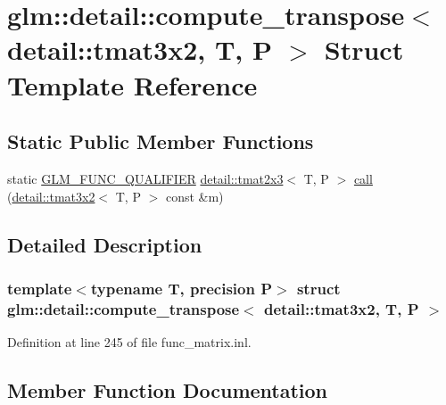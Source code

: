 \hypertarget{structglm_1_1detail_1_1compute__transpose_3_01detail_1_1tmat3x2_00_01_t_00_01_p_01_4}{}\section{glm\+:\+:detail\+:\+:compute\+\_\+transpose$<$ detail\+:\+:tmat3x2, T, P $>$ Struct Template Reference}
\label{structglm_1_1detail_1_1compute__transpose_3_01detail_1_1tmat3x2_00_01_t_00_01_p_01_4}
\subsection*{Static Public Member Functions}
\begin{DoxyCompactItemize}
\item 
static \hyperlink{setup_8hpp_a33fdea6f91c5f834105f7415e2a64407}{G\+L\+M\+\_\+\+F\+U\+N\+C\+\_\+\+Q\+U\+A\+L\+I\+F\+I\+ER} \hyperlink{structglm_1_1detail_1_1tmat2x3}{detail\+::tmat2x3}$<$ T, P $>$ \hyperlink{structglm_1_1detail_1_1compute__transpose_3_01detail_1_1tmat3x2_00_01_t_00_01_p_01_4_a0a30f21e987d479af32a28eb6aeb5def}{call} (\hyperlink{structglm_1_1detail_1_1tmat3x2}{detail\+::tmat3x2}$<$ T, P $>$ const \&m)
\end{DoxyCompactItemize}


\subsection{Detailed Description}
\subsubsection*{template$<$typename T, precision P$>$\newline
struct glm\+::detail\+::compute\+\_\+transpose$<$ detail\+::tmat3x2, T, P $>$}



Definition at line 245 of file func\+\_\+matrix.\+inl.



\subsection{Member Function Documentation}
\mbox{\label{structglm_1_1detail_1_1compute__transpose_3_01detail_1_1tmat3x2_00_01_t_00_01_p_01_4_a0a30f21e987d479af32a28eb6aeb5def}} 

